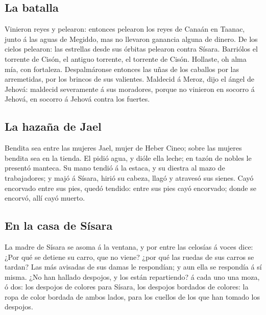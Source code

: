 \hypertarget{la-batalla}{%
\subsection{La batalla}\label{la-batalla}}

 Vinieron reyes y pelearon: entonces pelearon los reyes de
Canaán en Taanac, junto á las aguas de Megiddo, mas no llevaron ganancia
alguna de dinero.  De los cielos pelearon: las estrellas
desde sus órbitas pelearon contra Sísara.  Barriólos el
torrente de Cisón, el antiguo torrente, el torrente de Cisón. Hollaste,
oh alma mía, con fortaleza.  Despalmáronse entonces las
uñas de los caballos por las arremetidas, por los brincos de sus
valientes.  Maldecid á Meroz, dijo el ángel de Jehová:
maldecid severamente á sus moradores, porque no vinieron en socorro á
Jehová, en socorro á Jehová contra los fuertes.

\hypertarget{la-hazauxf1a-de-jael}{%
\subsection{La hazaña de Jael}\label{la-hazauxf1a-de-jael}}

 Bendita sea entre las mujeres Jael, mujer de Heber Cineo;
sobre las mujeres bendita sea en la tienda.  El pidió agua,
y dióle ella leche; en tazón de nobles le presentó manteca.
 Su mano tendió á la estaca, y su diestra al mazo de
trabajadores; y majó á Sísara, hirió su cabeza, llagó y atravesó sus
sienes.  Cayó encorvado entre sus pies, quedó tendido:
entre sus pies cayó encorvado; donde se encorvó, allí cayó muerto.

\hypertarget{en-la-casa-de-suxedsara}{%
\subsection{En la casa de Sísara}\label{en-la-casa-de-suxedsara}}

 La madre de Sísara se asoma á la ventana, y por entre las
celosías á voces dice: ¿Por qué se detiene su carro, que no viene? ¿por
qué las ruedas de sus carros se tardan?  Las más avisadas
de sus damas le respondían; y aun ella se respondía á sí misma.
 ¿No han hallado despojos, y los están repartiendo? á cada
uno una moza, ó dos: los despojos de colores para Sísara, los despojos
bordados de colores: la ropa de color bordada de ambos lados, para los
cuellos de los que han tomado los despojos.

